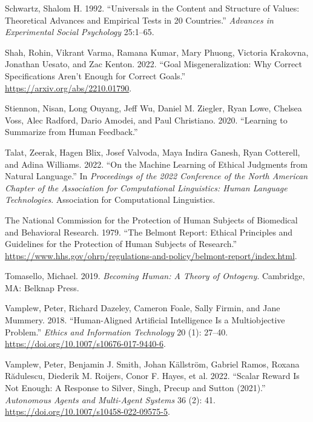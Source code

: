 \documentclass[
  letterpaper,
  numbers=noenddot,
  DIV=11]{scrreprt}
\newlength{\cslhangindent}
\newenvironment{CSLReferences}[2] %
 {\begin{list}{}{%
  \setlength{\itemindent}{0pt}
  \setlength{\leftmargin}{0pt}
  \setlength{\parsep}{0pt}
  \ifodd #1
   \setlength{\leftmargin}{\cslhangindent}
   \setlength{\itemindent}{-1\cslhangindent}
  \fi
  \setlength{\itemsep}{#2\baselineskip}}}
 {\end{list}}
\theoremstyle{definition}
\theoremstyle{plain}
\theoremstyle{plain}
\theoremstyle{remark}
\begin{document}
\begin{CSLReferences}{1}{0}
Schwartz, Shalom H. 1992. {``Universals in the Content and Structure of
Values: Theoretical Advances and Empirical Tests in 20 Countries.''}
\emph{Advances in Experimental Social Psychology} 25:1--65.

Shah, Rohin, Vikrant Varma, Ramana Kumar, Mary Phuong, Victoria
Krakovna, Jonathan Uesato, and Zac Kenton. 2022. {``Goal
Misgeneralization: Why Correct Specifications Aren't Enough for Correct
Goals.''} \url{https://arxiv.org/abs/2210.01790}.

Stiennon, Nisan, Long Ouyang, Jeff Wu, Daniel M. Ziegler, Ryan Lowe,
Chelsea Voss, Alec Radford, Dario Amodei, and Paul Christiano. 2020.
{``Learning to Summarize from Human Feedback.''}

Talat, Zeerak, Hagen Blix, Josef Valvoda, Maya Indira Ganesh, Ryan
Cotterell, and Adina Williams. 2022. {``On the Machine Learning of
Ethical Judgments from Natural Language.''} In \emph{Proceedings of the
2022 {Conference} of the {North} {American} {Chapter} of the
{Association} for {Computational} {Linguistics}: {Human} {Language}
{Technologies}}. Association for Computational Linguistics.

The National Commission for the Protection of Human Subjects of
Biomedical and Behavioral Research. 1979. {``The Belmont Report: Ethical
Principles and Guidelines for the Protection of Human Subjects of
Research.''}
\url{https://www.hhs.gov/ohrp/regulations-and-policy/belmont-report/index.html}.

Tomasello, Michael. 2019. \emph{Becoming Human: {A} Theory of Ontogeny}.
Cambridge, MA: Belknap Press.

Vamplew, Peter, Richard Dazeley, Cameron Foale, Sally Firmin, and Jane
Mummery. 2018. {``Human-Aligned Artificial Intelligence Is a
Multiobjective Problem.''} \emph{Ethics and Information Technology} 20
(1): 27--40. \url{https://doi.org/10.1007/s10676-017-9440-6}.

Vamplew, Peter, Benjamin J. Smith, Johan Källström, Gabriel Ramos,
Roxana Rădulescu, Diederik M. Roijers, Conor F. Hayes, et al. 2022.
{``Scalar Reward Is Not Enough: A Response to {Silver}, {Singh},
{Precup} and {Sutton} (2021).''} \emph{Autonomous Agents and Multi-Agent
Systems} 36 (2): 41. \url{https://doi.org/10.1007/s10458-022-09575-5}.


\end{CSLReferences}
\end{document}

